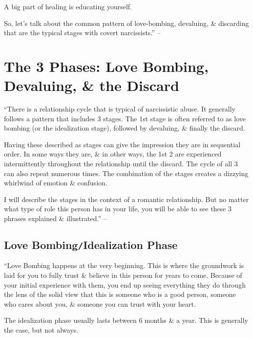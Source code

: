 \documentclass{article}
\numberwithin{equation}{section}
\begin{document}
A big part of healing is educating yourself.

So, let's talk about the common pattern of love-bombing, devaluing, \& discarding that are the typical stages with covert narcissists.'' -- \cite[pp. 24--31]{Mirza2017}


\section{The 3 Phases: Love Bombing, Devaluing, \& the Discard}
``There is a relationship cycle that is typical of narcissistic abuse. It generally follows a pattern that includes 3 stages. The 1st stage is often referred to as love bombing (or the idealization stage), followed by devaluing, \& finally the discard.

Having these described as stages can give the impression they are in sequential order. In some ways they are, \& in other ways, the 1st 2 are experienced intermittently throughout the relationship until the discard. The cycle of all 3 can also repeat numerous times. The combination of the stages creates a dizzying whirlwind of emotion \& confusion.

I will describe the stages in the context of a romantic relationship. But no matter what type of role this person has in your life, you will be able to see these 3 phrases explained \& illustrated.'' -- \cite[p. 32]{Mirza2017}

\subsection{Love Bombing\texttt{/}Idealization Phase}
``Love Bombing happens at the very beginning. This is where the groundwork is laid for you to fully trust \& believe in this person for years to come. Because of your initial experience with them, you end up seeing everything they do through the lens of the solid view that this is someone who is a good person, someone who cares about you, \& someone you can trust with your heart.

The idealization phase usually lasts between 6 months \& a year. This is generally the case, but not always.
\end{document}
